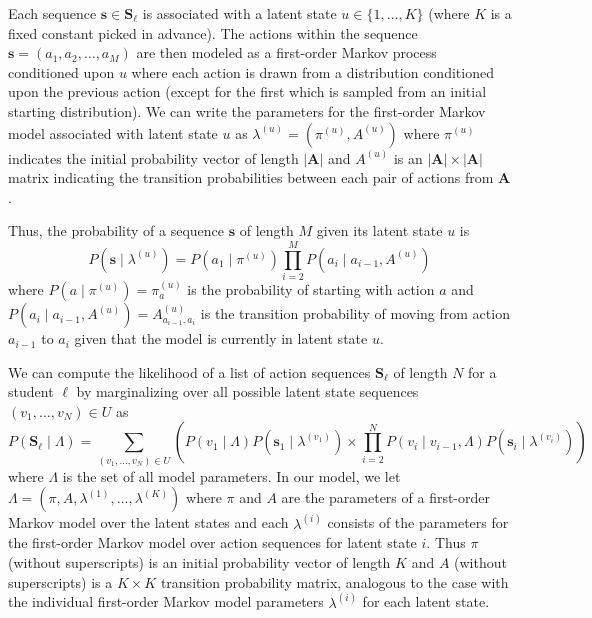 Each sequence $\mathbf{s} \in \mathbf{S}_\ell$ is associated with a latent
state $u \in \{1,\ldots,K\}$ (where $K$ is a fixed constant picked in
advance). The actions within the sequence $\mathbf{s} = (a_1, a_2, \ldots,
a_M)$ are then modeled as a first-order Markov process conditioned upon $u$
where each action is drawn from a distribution conditioned upon the
previous action (except for the first which is sampled from an initial
starting distribution). We can write the parameters for the first-order
Markov model associated with latent state $u$ as $\lambda^{(u)} =
(\pi^{(u)}, A^{(u)})$ where $\pi^{(u)}$ indicates the initial probability
vector of length $|\mathbf{A}|$ and $A^{(u)}$ is an $|\mathbf{A}| \times
|\mathbf{A}|$ matrix indicating the transition probabilities between each
pair of actions from $\mathbf{A}$.

Thus, the probability of a sequence $\mathbf{s}$ of length $M$ given its
latent state $u$ is
\begin{equation}
  P(\mathbf{s} \mid \lambda^{(u)}) = P(a_1 \mid \pi^{(u)}) \prod_{i=2}^M P(a_i \mid
  a_{i-1}, A^{(u)})
\end{equation}
where $P(a \mid \pi^{(u)}) = \pi^{(u)}_a$ is the probability of starting
with action $a$ and $P(a_i \mid a_{i-1}, A^{(u)}) = A^{(u)}_{a_{i-1}, a_i}$
is the transition probability of moving from action $a_{i-1}$ to $a_{i}$
given that the model is currently in latent state $u$.

We can compute the likelihood of a list of action sequences
$\mathbf{S}_\ell$ of length $N$ for a student $\ell$ by marginalizing over
all possible latent state sequences $(v_1, \ldots, v_N) \in U$ as
\begin{equation}
  P(\mathbf{S}_\ell \mid \Lambda)
  = \sum_{(v_1, \ldots, v_N) \in U} \left(P(v_1 \mid \Lambda)
  P(\mathbf{s}_1 \mid \lambda^{(v_1)}) \times \prod_{i=2}^N P(v_i \mid
  v_{i-1}, \Lambda) P(\mathbf{s}_i \mid \lambda^{(v_i)})\right)
\end{equation}
where $\Lambda$ is the set of all model parameters.  In our model, we let
$\Lambda = (\pi, A, \lambda^{(1)}, \ldots, \lambda^{(K)})$ where $\pi$ and
$A$ are the parameters of a first-order Markov model over the latent states
and each $\lambda^{(i)}$ consists of the parameters for the first-order
Markov model over action sequences for latent state $i$. Thus $\pi$
(without superscripts) is an initial probability vector of length $K$ and
$A$ (without superscripts) is a $K \times K$ transition probability matrix,
analogous to the case with the individual first-order Markov model
parameters $\lambda^{(i)}$ for each latent state.


